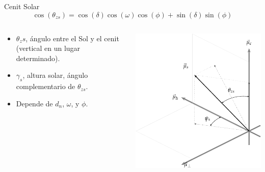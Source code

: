 \documentclass[xcolor={usenames,svgnames,dvipsnames}]{beamer}
\begin{document}
\begin{frame}[plain,label={sec:org25a1172}]{Cenit Solar}
\[
\cos(\theta_{zs}) = \cos(\delta) \cos(\omega) \cos(\phi) + \sin(\delta) \sin(\phi)
\]

\begin{columns}
\begin{column}{0.55\columnwidth}
\begin{itemize}
\item \(\theta_zs\), ángulo entre el Sol y el cenit (vertical en un lugar determinado).
\item \(\gamma_s\), altura solar, ángulo complementario de \(\theta_{zs}\).
\item Depende de \(d_n\), \(\omega\), y \(\phi\).
\end{itemize}
\end{column}
\begin{column}{0.75\columnwidth}
\begin{center}
\includegraphics[width=.9\linewidth]{../figs/SistemaCoordenadasLocal-crop.pdf}
\end{center}
\end{column}
\end{columns}
\end{frame}
\end{document}
